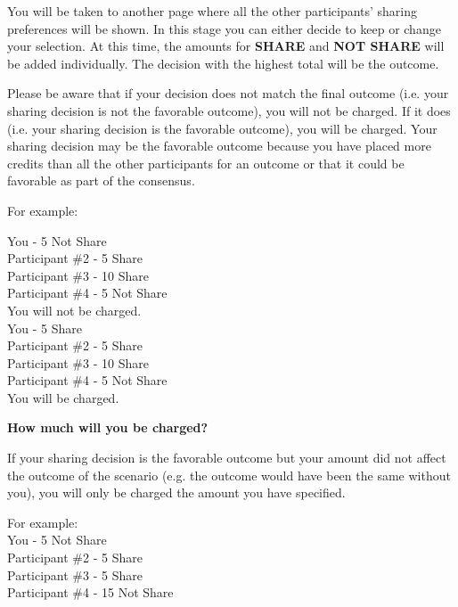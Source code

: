 You will be taken to another page where all the other participants’ sharing preferences will be shown. In this stage you can either decide to keep or change your selection. At this time, the amounts for \textbf{SHARE} and \textbf{NOT SHARE} will be added individually. The decision with the highest total will be the outcome.



Please be aware that if your decision does not match the final outcome (i.e. your sharing decision is not the favorable outcome), you will not be charged. If it does (i.e. your sharing decision is the favorable outcome), you will be charged. Your sharing decision may be the favorable outcome because you have placed more credits than all the other participants for an outcome or that it could be favorable as part of the consensus.

For example: \\
\vspace{-3mm}

You - 5 Not Share \\
\indent Participant \#2 - 5 Share \\
\indent Participant \#3 - 10 Share \\
\indent Participant \#4 - 5 Not Share \\

\vspace{-3mm}
You will not be charged. \\

\vspace{-3mm}
You - 5 Share \\
\indent Participant \#2 - 5 Share \\
\indent Participant \#3 - 10 Share \\
\indent Participant \#4 - 5 Not Share \\

\vspace{-3mm}
You will be charged.

\clearpage
{}

\textbf{How much will you be charged?}

If your sharing decision is the favorable outcome but your amount did not affect the outcome of the scenario (e.g. the outcome would have been the same without you), you will only be charged the amount you have specified.

For example: \\

You - 5 Not Share \\
\indent Participant \#2 - 5 Share \\
\indent Participant \#3 - 5 Share \\
\indent Participant \#4 - 15 Not Share \\

